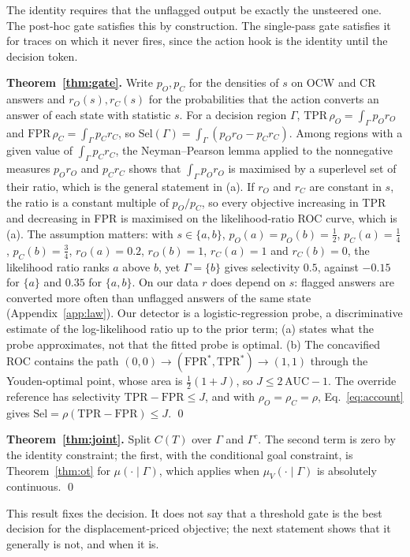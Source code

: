 \documentclass{article}
\newcommand{\ocw}{OCW}
\newcommand{\crok}{CR}
\begin{document}
The identity requires that the unflagged output be exactly the unsteered one.
The post-hoc gate satisfies this by construction. The single-pass gate
satisfies it for traces on which it never fires, since the action hook is the
identity until the decision token.

\textbf{Theorem~\ref{thm:gate}.} Write $p_O,p_C$ for the densities of $s$ on
\ocw{} and \crok{} answers and $r_O(s),r_C(s)$ for the probabilities that the
action converts an answer of each state with statistic $s$. For a decision
region $\Gamma$, $\mathrm{TPR}\,\rho_O=\int_\Gamma p_O r_O$ and
$\mathrm{FPR}\,\rho_C=\int_\Gamma p_C r_C$, so
$\mathrm{Sel}(\Gamma)=\int_\Gamma(p_O r_O-p_C r_C)$. Among regions with a given
value of $\int_\Gamma p_C r_C$, the Neyman--Pearson lemma applied to the
nonnegative measures $p_O r_O$ and $p_C r_C$ shows that
$\int_\Gamma p_O r_O$ is maximised by a superlevel set of their ratio, which is
the general statement in (a). If $r_O$ and $r_C$ are constant in $s$, the ratio
is a constant multiple of $p_O/p_C$, so every objective increasing in TPR and
decreasing in FPR is maximised on the likelihood-ratio ROC curve, which is (a).
The assumption matters: with $s\in\{a,b\}$, $p_O(a)=p_O(b)=\tfrac12$,
$p_C(a)=\tfrac14$, $p_C(b)=\tfrac34$, $r_O(a)=0.2$, $r_O(b)=1$, $r_C(a)=1$ and
$r_C(b)=0$, the likelihood ratio ranks $a$ above $b$, yet $\Gamma=\{b\}$ gives
selectivity $0.5$, against $-0.15$ for $\{a\}$ and $0.35$ for $\{a,b\}$. On
our data $r$ does depend on $s$: flagged answers are converted more often than
unflagged answers of the same state (Appendix~\ref{app:law}). Our detector is a
logistic-regression probe, a discriminative estimate of the log-likelihood
ratio up to the prior term; (a) states what the probe approximates, not that
the fitted probe is optimal. (b) The concavified ROC contains the path
$(0,0)\to(\mathrm{FPR}^*,\mathrm{TPR}^*)\to(1,1)$ through the Youden-optimal
point, whose area is $\tfrac12(1+J)$, so $J\le2\,\mathrm{AUC}-1$. The override
reference has selectivity $\mathrm{TPR}-\mathrm{FPR}\le J$, and with
$\rho_O=\rho_C=\rho$, Eq.~\eqref{eq:account} gives $\mathrm{Sel}=\rho(\mathrm{TPR}-\mathrm{FPR})\le J$. \qed

\textbf{Theorem~\ref{thm:joint}.} Split $C(T)$ over $\Gamma$ and $\Gamma^c$.
The second term is zero by the identity constraint; the first, with the
conditional goal constraint, is Theorem~\ref{thm:ot} for
$\mu(\cdot\mid\Gamma)$, which applies when $\mu_V(\cdot\mid\Gamma)$ is
absolutely continuous. \qed

This result fixes the decision. It does not say that a threshold gate is the
best decision for the displacement-priced objective; the next statement shows
that it generally is not, and when it is.
\end{document}
